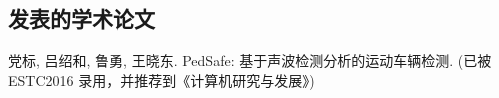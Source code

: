 \begin{resume}

  \section*{发表的学术论文} %

  \begin{enumerate}[{[}1{]}]
  \addtolength{\itemsep}{-.36\baselineskip}%
  \item 党标, 吕绍和, 鲁勇, 王晓东. PedSafe: 基于声波检测分析的运动车辆检测. (已被 ESTC2016 录用，并推荐到《计算机研究与发展》)

  \end{enumerate}


\end{resume}
